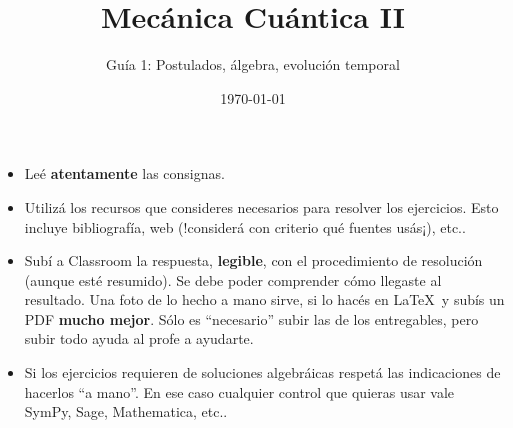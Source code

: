 \documentclass[a4paper,12pt]{article}
\begin{document}
\title{Mecánica Cuántica II}

\author{Guía 1: Postulados, álgebra, evolución temporal }

\date{\today}

\maketitle

\begin{itemize}
    \item Leé {\bf atentamente} las consignas.
    \item Utilizá los recursos que consideres necesarios para resolver los ejercicios. Esto incluye bibliografía, web (!considerá con criterio qué fuentes usás¡), etc..
    \item Subí a Classroom la respuesta, {\bf legible}, con el procedimiento de resolución (aunque esté resumido). Se debe poder comprender cómo llegaste al resultado. Una foto de lo hecho a mano sirve, si lo hacés en \LaTeX\ y subís un PDF {\bf mucho mejor}. Sólo es ``necesario'' subir las de los entregables, pero subir todo ayuda al profe a ayudarte.
    \item Si los ejercicios requieren de soluciones algebráicas respetá las indicaciones de hacerlos ``a mano''. En ese caso cualquier control que quieras usar vale SymPy, Sage, Mathematica, etc.. 
\end{itemize}
\end{document}
